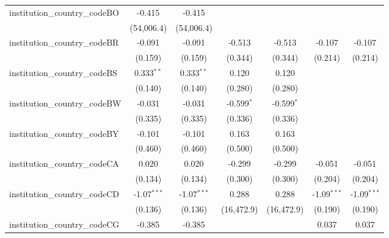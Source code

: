 \begin{tabular}{lcccccc}
   institution\_country\_codeBO          & -0.415         & -0.415         &                &                &                &   \\   
                                         & (54,006.4)     & (54,006.4)     &                &                &                &   \\   
   institution\_country\_codeBR          & -0.091         & -0.091         & -0.513         & -0.513         & -0.107         & -0.107\\   
                                         & (0.159)        & (0.159)        & (0.344)        & (0.344)        & (0.214)        & (0.214)\\   
   institution\_country\_codeBS          & 0.333$^{**}$   & 0.333$^{**}$   & 0.120          & 0.120          &                &   \\   
                                         & (0.140)        & (0.140)        & (0.280)        & (0.280)        &                &   \\   
   institution\_country\_codeBW          & -0.031         & -0.031         & -0.599$^{*}$   & -0.599$^{*}$   &                &   \\   
                                         & (0.335)        & (0.335)        & (0.336)        & (0.336)        &                &   \\   
   institution\_country\_codeBY          & -0.101         & -0.101         & 0.163          & 0.163          &                &   \\   
                                         & (0.460)        & (0.460)        & (0.500)        & (0.500)        &                &   \\   
   institution\_country\_codeCA          & 0.020          & 0.020          & -0.299         & -0.299         & -0.051         & -0.051\\   
                                         & (0.134)        & (0.134)        & (0.300)        & (0.300)        & (0.204)        & (0.204)\\   
   institution\_country\_codeCD          & -1.07$^{***}$  & -1.07$^{***}$  & 0.288          & 0.288          & -1.09$^{***}$  & -1.09$^{***}$\\   
                                         & (0.136)        & (0.136)        & (16,472.9)     & (16,472.9)     & (0.190)        & (0.190)\\   
   institution\_country\_codeCG          & -0.385         & -0.385         &                &                & 0.037          & 0.037\\   

\end{tabular}
